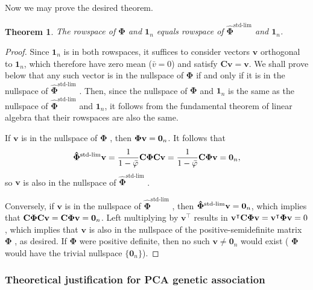 \documentclass[11pt]{article}
\newcommand{\kinMat}{%
  \ensuremath{%
    \mathbf{\Phi}
  }%
  \xspace%
}%
\newcommand{\kinMatStdLim}{%
  \ensuremath{%
    \mathbf{\hat{\Phi}}^\text{std-lim}
  }%
  \xspace%
}%
\newtheorem*{thm}{Theorem}
\begin{document}
Now we may prove the desired theorem.

\begin{thm}
  The rowspace of \kinMat and $\mathbf{1}_n$ equals rowspace of \kinMatStdLim and $\mathbf{1}_n$.
\end{thm}

\begin{proof}
  Since $\mathbf{1}_n$ is in both rowspaces, it suffices to consider vectors $\mathbf{v}$ orthogonal to $\mathbf{1}_n$, which therefore have zero mean ($\bar{v}=0$) and satisfy $\mathbf{C} \mathbf{v} = \mathbf{v}$.
  We shall prove below that any such vector is in the nullspace of \kinMat if and only if it is in the nullspace of \kinMatStdLim.
  Then, since the nullspace of \kinMat and $\mathbf{1}_n$ is the same as the nullspace of \kinMatStdLim and $\mathbf{1}_n$, it follows from the fundamental theorem of linear algebra that their rowspaces are also the same.
  
  If $\mathbf{v}$ is in the nullspace of \kinMat, then $\kinMat \mathbf{v} = \mathbf{0}_n$.
  It follows that
  $$
  \kinMatStdLim \mathbf{v}
  =
  \frac{1}{1 - \bar{\varphi}}
  \mathbf{C} \kinMat \mathbf{C} \mathbf{v}
  =
  \frac{1}{1 - \bar{\varphi}}
  \mathbf{C} \kinMat \mathbf{v}
  =
  \mathbf{0}_n
  ,
  $$
  so $\mathbf{v}$ is also in the nullspace of \kinMatStdLim.
  
  Conversely, if $\mathbf{v}$ is in the nullspace of \kinMatStdLim, then $\kinMatStdLim \mathbf{v} = \mathbf{0}_n$, which implies that
  $
  \mathbf{C} \kinMat \mathbf{C} \mathbf{v}
  =
  \mathbf{C} \kinMat \mathbf{v}
  =
  \mathbf{0}_n
  $.
  Left multiplying by $\mathbf{v}^\intercal$ results in
  $
  \mathbf{v}^\intercal \mathbf{C} \kinMat \mathbf{v}
  =
  \mathbf{v}^\intercal \kinMat \mathbf{v}
  =
  0
  $, which implies that $\mathbf{v}$ is also in the nullspace of the positive-semidefinite matrix \kinMat, as desired.
  If \kinMat were positive definite, then no such $\mathbf{v} \ne \mathbf{0}_n$ would exist (\kinMat would have the trivial nullspace $\{ \mathbf{0}_n \}$).
\end{proof}

\subsubsection{Theoretical justification for PCA genetic association}
\end{document}
